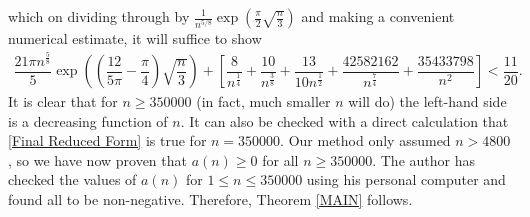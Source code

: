 \documentclass[11pt,reqno]{amsart}
\theoremstyle{definition}
\theoremstyle{plain}
\theoremstyle{named}
\numberwithin{equation}{section}
\theoremstyle{example}
\def\lp{\left(}
\def\rp{\right)}
\begin{document}
which on dividing through by $\frac{1}{n^{5/8}} \exp\lp \frac{\pi}{2} \sqrt{\frac{n}{3}} \rp$ and making a convenient numerical estimate, it will suffice to show
\begin{align} \label{Final Reduced Form}
	\dfrac{21\pi n^{\frac 58}}{5} \exp\lp \lp \dfrac{12}{5\pi} - \dfrac{\pi}{4} \rp \sqrt{\dfrac{n}{3}} \rp + \left[ \dfrac{8}{n^{\frac 14}} + \dfrac{10}{n^{\frac 38}} + \dfrac{13}{10 n^{\frac 12}} + \dfrac{42582162}{n^{\frac{7}{4}}} + \dfrac{35433798}{n^2} \right] < \dfrac{11}{20}.
\end{align}
It is clear that for $n \geq 350000$ (in fact, much smaller $n$ will do) the left-hand side is a decreasing function of $n$. It can also be checked with a direct calculation that \eqref{Final Reduced Form} is true for $n = 350000$. Our method only assumed $n > 4800$, so we have now proven that $a(n) \geq 0$ for all $n \geq 350000$. The author has checked the values of $a(n)$ for $1 \leq n \leq 350000$ using his personal computer and found all to be non-negative. Therefore, Theorem \ref{MAIN} follows.
\end{document}
